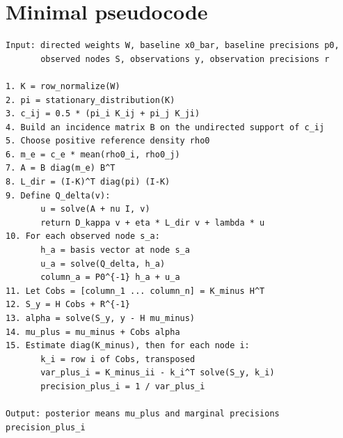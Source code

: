 \documentclass[11pt]{article}
\numberwithin{equation}{section}
\begin{document}
\section{Minimal pseudocode}
\label{app:pseudocode}

\begin{verbatim}
Input: directed weights W, baseline x0_bar, baseline precisions p0,
       observed nodes S, observations y, observation precisions r

1. K = row_normalize(W)
2. pi = stationary_distribution(K)
3. c_ij = 0.5 * (pi_i K_ij + pi_j K_ji)
4. Build an incidence matrix B on the undirected support of c_ij
5. Choose positive reference density rho0
6. m_e = c_e * mean(rho0_i, rho0_j)
7. A = B diag(m_e) B^T
8. L_dir = (I-K)^T diag(pi) (I-K)
9. Define Q_delta(v):
       u = solve(A + nu I, v)
       return D_kappa v + eta * L_dir v + lambda * u
10. For each observed node s_a:
       h_a = basis vector at node s_a
       u_a = solve(Q_delta, h_a)
       column_a = P0^{-1} h_a + u_a
11. Let Cobs = [column_1 ... column_n] = K_minus H^T
12. S_y = H Cobs + R^{-1}
13. alpha = solve(S_y, y - H mu_minus)
14. mu_plus = mu_minus + Cobs alpha
15. Estimate diag(K_minus), then for each node i:
       k_i = row i of Cobs, transposed
       var_plus_i = K_minus_ii - k_i^T solve(S_y, k_i)
       precision_plus_i = 1 / var_plus_i

Output: posterior means mu_plus and marginal precisions precision_plus_i
\end{verbatim}
\end{document}
